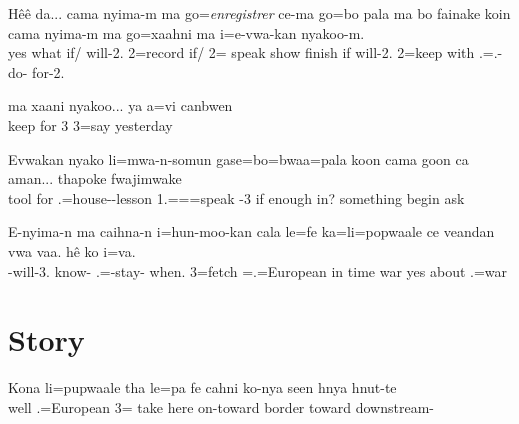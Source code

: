 \ea
\gll Hêê da... cama nyima-m ma go=\textit{enregistrer} ce-ma go=bo pala ma bo fainake koin cama nyima-m ma go=xaahni ma i=e-vwa-kan nyakoo-m.\\ 
yes what if/ will-2.  2=record if/ 2= speak   show finish if will-2.  2=keep with .=.-do- for-2.\\ 
\glt {} 
\z 

\ea
\gll ma xaani nyakoo... ya a=vi canbwen \\ 
 keep for 3 3=say yesterday \\ 
\glt {}
 \z 

\ea
\gll Evwakan nyako li=mwa-n-somun gase=bo=bwaa=pala koon cama goon ca aman... thapoke fwajimwake \\ 
tool for .=house--lesson 1.===speak -3 if enough in? something begin ask \\ 
 \glt {}
\z 

\ea
\gll E-nyima-n ma caihna-n i=hun-moo-kan cala le=fe ka=li=popwaale ce veandan vwa vaa. hê ko i=va.\\ 
-will-3.  know- .=-stay- when. 3=fetch =.=European in time  war yes about .=war\\ 
 \glt {} 
\z

\section{Story}%

\ea
\gll Kona li=pupwaale tha le=pa fe cahni ko-nya seen hnya hnut-te\\ 
well .=European  3= take here on-toward border toward downstream-\\ 
\glt {}
 \z
  
